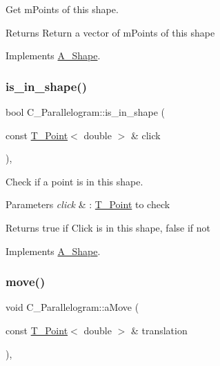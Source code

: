 Get mPoints of this shape.

\begin{DoxyReturn}{Returns}
Return a vector of mPoints of this shape
\end{DoxyReturn}


Implements \hyperlink{classShape_add74a5c682840fa4a519242b1ddbd0b5}{A_Shape}.

\mbox{\label{classParallelogram_a585b14ca0f65ed3a5007e8c1df3c6bc4}} 
\subsubsection{\texorpdfstring{is\+\_\+in\+\_\+shape()}{is\_in\_shape()}}
{\footnotesize\ttfamily bool C_Parallelogram\+::is\+\_\+in\+\_\+shape (\begin{DoxyParamCaption}\item[{const \hyperlink{classPoint}{T_Point}$<$ double $>$ \&}]{click }\end{DoxyParamCaption})\hspace{0.3cm}{\ttfamily [override]}, {\ttfamily [virtual]}}



Check if a point is in this shape. 


\begin{DoxyParams}{Parameters}
{\em click} & \+: \hyperlink{classPoint}{T_Point} to check \\
\hline
\end{DoxyParams}
\begin{DoxyReturn}{Returns}
true if Click is in this shape, false if not
\end{DoxyReturn}


Implements \hyperlink{classShape_aa09a621da090e42840b4bec7ffb27620}{A_Shape}.

\mbox{\label{classParallelogram_ae8d51f9b629160df31c8a12c28da279e}} 
\subsubsection{\texorpdfstring{move()}{move()}}
{\footnotesize\ttfamily void C_Parallelogram\+::aMove (\begin{DoxyParamCaption}\item[{const \hyperlink{classPoint}{T_Point}$<$ double $>$ \&}]{translation }\end{DoxyParamCaption})\hspace{0.3cm}{\ttfamily [override]}, {\ttfamily [virtual]}}




